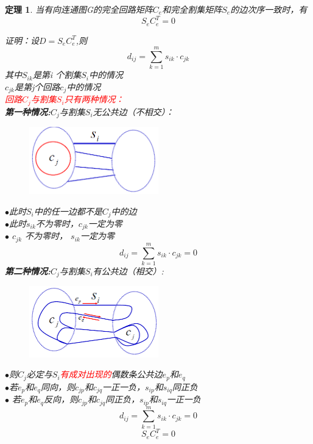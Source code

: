 \documentclass[11pt,a4paper,openany]{book}
\newcommand{\song}{\CJKfamily{song}}
\newtheorem{theorem}{\textbf{定理}}[section]
\begin{document}
\begin{theorem}
当有向连通图G的完全回路矩阵$C_e$和完全割集矩阵$S_e$的边次序一致时，有
$$S_eC_e^T=0$$
{\song
证明：设$D=S_eC_e^T$,则$$d_{ij}=\sum_{k=1}^{m}s_{ik}\cdot c_{jk}$$
其中$S_{ik}$是第i 个割集$S_i$中的情况\\
\indent $c_{jk}$是第j个回路$c_j$中的情况\\
\textcolor{red}{回路$C_j$与割集$S_i$只有两种情况：\\}
\textbf{第一种情况:}$C_j$与割集$S_i$无公共边（不相交）：\\
\begin{figure}[H]
  \centering
  \includegraphics[width=0.5\textwidth]{f5.png}\\
  \caption*{}
\end{figure}
\noindent $\bullet$此时$S_i$中的任一边都不是$C_j$中的边\\
$\bullet$此时$s_{ik}$不为零时，$c_{jk}$一定为零\\
$\bullet$ $c_{jk}$ 不为零时， $s_{ik}$一定为零\\
$$d_{ij}=\sum_{k=1}^{m}s_{ik}\cdot c_{jk}=0$$
\textbf{第二种情况:}$C_j$与割集$S_i$有公共边（相交）:\\
\begin{figure}[H]
  \centering
  \includegraphics[width=0.5\textwidth]{f6.png}\\
  \caption*{}
\end{figure}
\noindent $\bullet$则$C_j$必定与$S_i$\textcolor{red}{有成对出现的}偶数条公共边$e_p$和$e_q$\\
$\bullet$若$e_p$和$e_q$同向，则$c_{jp}$和$c_{jq}$一正一负，$s_{ip}$和$s_{iq}$同正负\\
$\bullet$ 若$e_p$和$e_q$反向，则$c_{jp}$和$c_{jq}$同正负，$s_{ip}$和$s_{iq}$一正一负\\
$$d_{ij}=\sum_{k=1}^{m}s_{ik}\cdot c_{jk}=0$$
$$S_eC_e^T=0$$
}
\end{theorem}
\end{document}
